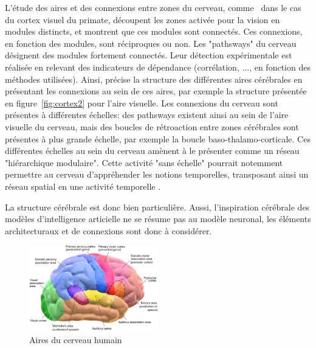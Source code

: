L'étude des aires et des connexions entre zones du cerveau, comme~\cite{primate_cortex_91} dans le cas du cortex visuel du primate, découpent les zones activée pour la vision en modules distincts, et montrent que ces modules sont connectés. Ces connexions, en fonction des modules, sont réciproques ou non. Les "pathsways" du cerveau désignent des modules fortement connectés. Leur détection expérimentale est réalisée en relevant des indicateurs de dépendance (corrélation, ..., en fonction des méthodes utilisées). Ainsi, \cite{Rolls2002ComputationalNO} précise la structure des différentes aires cérébrales en présentant les connexions au sein de ces aires, par exemple la structure présentée en figure~\ref{fig:cortex2} pour l'aire visuelle. 
Les connexions du cerveau sont présentes à différentes échelles: des pathsways existent ainsi au sein de l'aire visuelle du cerveau, mais des boucles de rétroaction entre zones cérébrales sont présentes à plus grande échelle, par exemple la boucle baso-thalamo-corticale. Ces différentes échelles au sein du cerveau amènent \cite{Meunier2010ModularAH} à le présenter comme un réseau "hiérarchique modulaire". Cette activité "sans échelle" pourrait notemment permettre au cerveau d'appréhender les notions temporelles, transposant ainsi un réseau spatial en une activité temporelle \cite{biyu_scale-free_2014}.

La structure cérébrale est donc bien particulière. Aussi, l'inspiration cérébrale des modèles d'intelligence articielle ne se résume pas au modèle neuronal, les éléments architecturaux et de connexions sont donc à considérer. 
\begin{figure}[t]
\centering
\includegraphics[width=0.5\textwidth]{Blausen_0102.png}
\caption{Aires du cerveau humain}
\end{figure}

